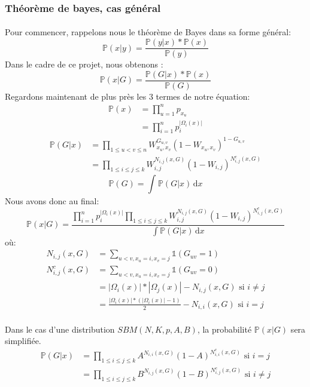 \subsubsection{Théorème de bayes, cas général}
\paragraph{}
Pour commencer, rappelons nous le théorème de Bayes dans sa forme général:
\begin{equation*}
    \mathbb{P}(x|y) = \frac{\mathbb{P}(y|x)*\mathbb{P}(x)}{\mathbb{P}(y)}
\end{equation*}
Dans le cadre de ce projet, nous obtenons :
\begin{equation*}
    \mathbb{P}(x|G) = \frac{\mathbb{P}(G|x)*\mathbb{P}(x)}{\mathbb{P}(G)}
\end{equation*}
Regardons maintenant de plus près les 3 termes de notre équation:
\begin{align*}
    \mathbb{P}(x) &= \prod_{u=1}^n p_{x_u} \\ 
                  &= \prod_{i=1}^n p_i^{|\Omega_i(x)|}
\end{align*}
\begin{align*}
    \mathbb{P}(G|x) &= \prod_{1 \leq u < v \leq n} W_{x_u,x_v}^{G_{u,v}} (1-W_{x_u,x_v})^{1-G_{u,v}}\\ 
                    &= \prod_{1 \leq i \leq j \leq k} W_{i,j}^{N_{i,j}(x,G)} (1-W_{i,j})^{N_{i,j}^c(x,G)}
\end{align*}
\begin{equation*}
    \mathbb{P}(G) = \int_{}^{} \mathbb{P}(G|x) \, \mathrm{d}x
\end{equation*}
Nous avons donc au final:
\begin{equation*}
    \mathbb{P}(x|G) = \frac{\prod_{i=1}^n p_i^{|\Omega_i(x)|} \prod_{1 \leq i \leq j \leq k} W_{i,j}^{N_{i,j}(x,G)} (1-W_{i,j})^{N_{i,j}^c(x,G)}}{ \int\mathbb{P}(G|x) \, \mathrm{d}x}
\end{equation*}
où:
\begin{align*}
    N_{i,j}(x,G)&=\sum_{u<v,x_u=i,x_v=j} \mathbb{1} (G_{uv}=1) \\
    N_{i,j}^c(x,G) &= \sum_{u<v,x_u=i,x_v=j} \mathbb{1} (G_{uv}=0)\\
                   &= |\Omega_i(x)|*|\Omega_j(x)| - N_{i,j}(x,G) \text{  si }i \ne j\\
                   &= \frac{|\Omega_i(x)|*(|\Omega_i(x)|-1)}{2} - N_{i,i}(x,G) \text{  si }i = j
\end{align*}
\paragraph*{}
Dans le cas d'une distribution $SBM(N,K,p,A,B)$, la probabilité $\mathbb{P}(x|G)$ sera simplifiée.
\begin{align*}
    \mathbb{P}(G|x) &= \prod_{1 \leq i \leq j \leq k} A^{N_{i,i}(x,G)} (1-A)^{N_{i,i}^c(x,G)}\text{ si }i=j\\
                    &= \prod_{1 \leq i \leq j \leq k} B^{N_{i,j}(x,G)} (1-B)^{N_{i,j}^c(x,G)}\text{ si }i \ne j
\end{align*}
